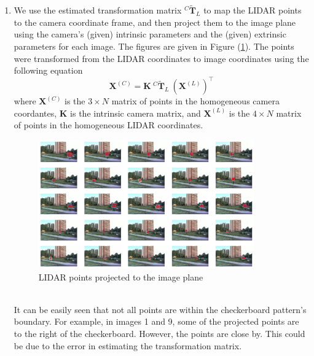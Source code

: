 \documentclass[10pt]{article}
\newcommand{\figref}[1]{Figure (\ref{fig:#1})}
\begin{document}
\begin{enumerate}
        \item We use the estimated transformation matrix $^{C} \mathbf{\tilde{T}}_{L}$ to
        map the LIDAR points to the camera coordinate frame, and then project them to
        the image plane using the camera's (given) intrinsic parameters and the (given)
        extrinsic parameters for each image. The figures are given in
        \figref{lidar-projection}. The points were transformed from the LIDAR coordinates
        to image coordinates using the following equation
        \begin{equation*}
            \mathbf{X}^{(C)} = \mathbf{K} \ ^{C} \mathbf{\tilde{T}}_{L} \
            \left( \mathbf{X}^{(L)} \right) ^{\top}
        \end{equation*}
        where $\mathbf{X}^{(C)}$ is the $3 \times N$ matrix of points in the homogeneous
        camera coordantes, $\mathbf{K}$ is the intrinsic camera matrix, and
        $\mathbf{X}^{(L)}$ is the $4 \times N$ matrix of points in the homogeneous LIDAR
        coordinates.
        \begin{figure}[htbp]
            \begin{center}
                \includegraphics[width=0.875\textwidth]{Assets/Question-5/projection.png}
                \caption{LIDAR points projected to the image plane}
                \label{fig:lidar-projection}
            \end{center}
        \end{figure} \\
        It can be easily seen that not all points are within the checkerboard pattern's
        boundary. For example, in images 1 and 9, some of the projected points are to the
        right of the checkerboard. However, the points are close by. This could be due to
        the error in estimating the transformation matrix.


\end{enumerate}
\end{document}
